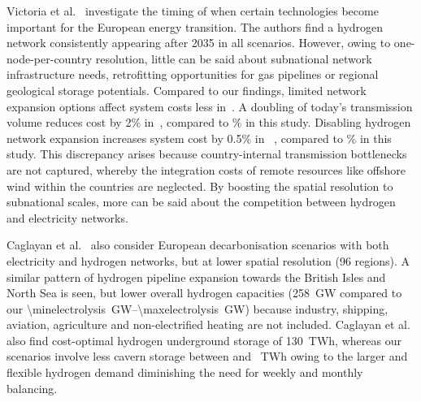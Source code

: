 Victoria et al.~\cite{victoriaSpeedTechnological2022} investigate the timing of
when certain technologies %
become important for the European energy transition. The authors find a hydrogen
network consistently appearing after 2035 in all scenarios. However, owing to
one-node-per-country resolution, little can be said about subnational network
infrastructure needs, retrofitting opportunities for gas pipelines or regional
geological storage potentials. Compared to our findings, limited network
expansion options affect system costs less
in~\cite{victoriaSpeedTechnological2022}. A doubling of today's transmission
volume reduces cost by 2\% in~\cite{victoriaSpeedTechnological2022}, compared to
\maxacbenefitrel\% in this study. Disabling hydrogen network expansion increases
system cost by 0.5\% in ~\cite{victoriaSpeedTechnological2022}, compared to
\maxhybenefitrel\% in this study. This discrepancy arises because
country-internal transmission bottlenecks are not captured, whereby the
integration costs of remote resources like offshore wind within the countries
are neglected. By boosting the spatial resolution to subnational scales, more
can be said about the competition between hydrogen and electricity networks.

Caglayan et al.~\cite{Caglayan2019} also consider European decarbonisation
scenarios with both electricity and hydrogen networks, but at lower spatial
resolution (96 regions). A similar pattern of hydrogen pipeline expansion
towards the British Isles and North Sea is seen, but lower overall hydrogen
capacities (258~GW compared to our
\SIrange{\minelectrolysis}{\maxelectrolysis}{\giga\watt}) because industry,
shipping, aviation, agriculture and non-electrified heating are not included.
Caglayan et al.~\cite{Caglayan2019} also find cost-optimal hydrogen underground
storage of 130~TWh, whereas our scenarios involve less cavern storage between
\hydrogenstorageacyhyn and \hydrogenstorageacnhyn~TWh owing to the larger and
flexible hydrogen demand diminishing the need for weekly and monthly balancing.

